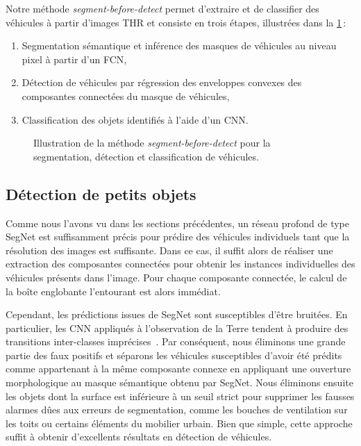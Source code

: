 Notre méthode \emph{segment-before-detect} permet d'extraire et de classifier des véhicules à partir d'images \gls{THR} et consiste en trois étapes, illustrées dans la \cref{fig:pipeline}\,:
\begin{enumerate}
\item Segmentation sémantique et inférence des masques de véhicules au niveau pixel à partir d'un \gls{FCN},
\item Détection de véhicules par régression des enveloppes convexes des composantes connectées du masque de véhicules,
\item Classification des objets identifiés à l'aide d'un \gls{CNN}.
\end{enumerate}

\begin{figure}[t]
  \resizebox{\textwidth}{!}{%
  	
  }
  \caption{Illustration de la méthode \emph{segment-before-detect} pour la segmentation, détection et classification de véhicules.}
  \label{fig:pipeline}
\end{figure}

\subsection{Détection de petits objets}

Comme nous l'avons vu dans les sections précédentes, un réseau profond de type SegNet est suffisamment précis pour prédire des véhicules individuels tant que la résolution des images est suffisante. Dans ce cas, il suffit alors de réaliser une extraction des composantes connectées pour obtenir les instances individuelles des véhicules présents dans l'image. Pour chaque composante connectée, le calcul de la boîte englobante l'entourant est alors immédiat.

Cependant, les prédictions issues de SegNet sont susceptibles d'être bruitées. En particulier, les \gls{CNN} appliqués à l'observation de la Terre tendent à produire des transitions inter-classes imprécises~\cite{marmanis_classification_2017}. Par conséquent, nous éliminons une grande partie des faux positifs et séparons les véhicules susceptibles d'avoir été prédits comme appartenant à la même composante connexe en appliquant une ouverture morphologique au masque sémantique obtenu par SegNet. Nous éliminons ensuite les objets dont la surface est inférieure à un seuil strict pour supprimer les fausses alarmes dûes aux erreurs de segmentation, comme les bouches de ventilation sur les toits ou certains éléments du mobilier urbain. Bien que simple, cette approche suffit à obtenir d'excellents résultats en détection de véhicules.

